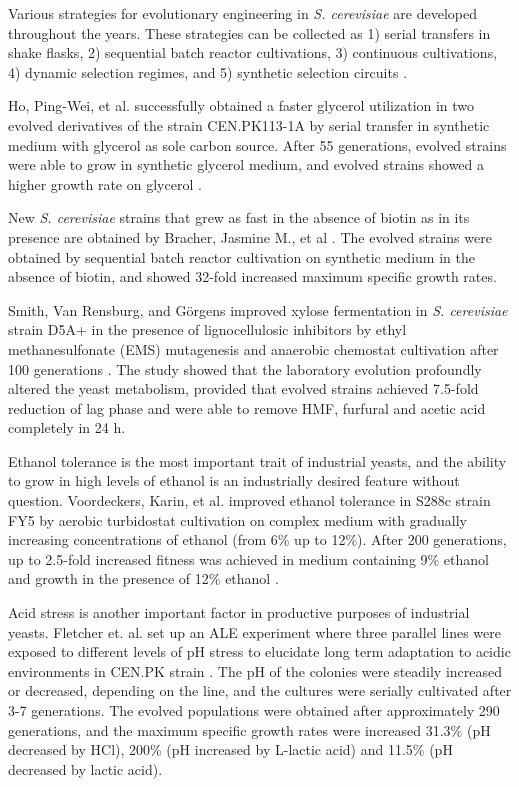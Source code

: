 Various strategies for evolutionary engineering in \emph{S. cerevisiae} are developed throughout the years. These strategies can be collected as 1) serial transfers in shake flasks, 2) sequential batch reactor cultivations, 3) continuous cultivations, 4) dynamic selection regimes, and 5) synthetic selection circuits \cite{mans2018under}.

Ho, Ping-Wei, et al. successfully obtained a faster glycerol utilization in two evolved derivatives of the strain CEN.PK113-1A by serial transfer in synthetic medium with glycerol as sole carbon source. After 55 generations, evolved strains were able to grow in synthetic glycerol medium, and evolved strains showed a higher growth rate on glycerol \cite{ho2017sole}.

New \emph{S. cerevisiae} strains that grew as fast in the absence of biotin as in its presence are obtained by Bracher, Jasmine M., et al \cite{bracher2017laboratory}. The evolved strains were obtained by sequential batch reactor cultivation on synthetic medium in the absence of biotin, and showed 32-fold increased maximum specific growth rates.

Smith, Van Rensburg, and Görgens improved xylose fermentation in \emph{S. cerevisiae} strain D5A+ in the presence of lignocellulosic inhibitors by ethyl methanesulfonate (EMS) mutagenesis and anaerobic chemostat cultivation after 100  generations \cite{smith2014simultaneously}. The study showed that the laboratory evolution profoundly altered the yeast metabolism, provided that evolved strains achieved 7.5-fold reduction of lag phase and were able to remove HMF, furfural and acetic acid completely in 24 h.

Ethanol tolerance is the most important trait of industrial yeasts, and the ability to grow in high levels of ethanol is an industrially desired feature without question. Voordeckers, Karin, et al. improved ethanol tolerance in S288c strain FY5 by aerobic turbidostat cultivation on complex medium with gradually increasing concentrations of ethanol (from 6\% up to 12\%). After 200 generations, up to 2.5-fold increased fitness was achieved in medium containing 9\% ethanol and growth in the presence of 12\% ethanol \cite{voordeckers2015adaptation}.

Acid stress is another important factor in productive purposes of industrial yeasts. Fletcher et. al. set up an ALE experiment where three parallel lines were exposed to different levels of pH stress to elucidate long term adaptation to acidic environments in CEN.PK strain \cite{fletcher2017evolutionary}. The pH of the colonies were steadily increased or decreased, depending on the line, and the cultures were serially cultivated after 3-7 generations. The evolved populations were obtained after approximately 290 generations, and the maximum specific growth rates were increased 31.3\% (pH decreased by HCl), 200\% (pH increased by L-lactic acid) and 11.5\% (pH decreased by lactic acid).

